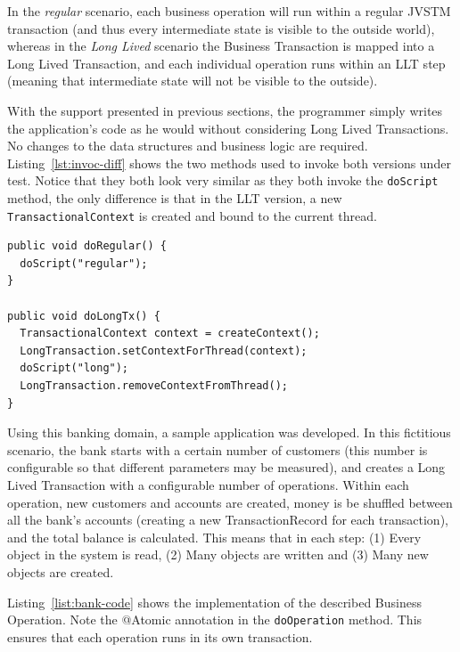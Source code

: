 In the {\it regular} scenario, each business operation will run within
a regular JVSTM transaction (and thus every intermediate state is
visible to the outside world), whereas in the {\it Long Lived}
scenario the Business Transaction is mapped into a Long Lived
Transaction, and each individual operation runs within an LLT step
(meaning that intermediate state will not be visible to the outside).

With the support presented in previous sections, the programmer simply
writes the application's code as he would without considering Long
Lived Transactions. No changes to the data structures and business
logic are required. Listing~\ref{lst:invoc-diff} shows the two methods
used to invoke both versions under test. Notice that they both look
very similar as they both invoke the \texttt{doScript} method, the
only difference is that in the LLT version, a new
\texttt{TransactionalContext} is created and bound to the current
thread.

\begin{lstlisting}[caption={Invoking the business operation},
 label={lst:invoc-diff},float]
public void doRegular() {
  doScript("regular");
}

public void doLongTx() {
  TransactionalContext context = createContext();
  LongTransaction.setContextForThread(context);
  doScript("long");
  LongTransaction.removeContextFromThread();
}
\end{lstlisting}

Using this banking domain, a sample application was developed. In this
fictitious scenario, the bank starts with a certain number of
customers (this number is configurable so that different parameters
may be measured), and creates a Long Lived Transaction with a
configurable number of operations. Within each operation, new
customers and accounts are created, money is be shuffled between all
the bank's accounts (creating a new TransactionRecord for each
transaction), and the total balance is calculated. This means that in
each step: (1) Every object in the system is read, (2) Many objects
are written and (3) Many new objects are created.

Listing~\ref{list:bank-code} shows the implementation of the described
Business Operation. Note the @Atomic annotation in the
\texttt{doOperation} method. This ensures that each operation runs in
its own transaction.

